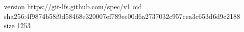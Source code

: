 version https://git-lfs.github.com/spec/v1
oid sha256:4f9874b58f9d58468e320007ef789ee00d6a2737032c957cea3c653d6d9c2188
size 1253
